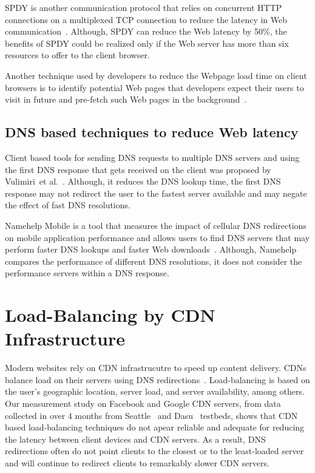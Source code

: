 \documentclass{llncs}
\begin{document}
SPDY is another communication protocol that relies on concurrent HTTP connections on a multiplexed TCP connection to reduce the latency in Web communication~\cite{spdy:whitepaper}\cite{googledevelopers:spdy}.
Although, SPDY can reduce the Web latency by 50\%, the benefits of SPDY could be realized only if the Web server has more than six resources to offer to the client browser.

Another technique used by developers to reduce the Webpage load time on client browsers is to identify potential Web pages that developers expect their users to visit in future and pre-fetch such Web pages in the background~\cite{google:bandwidthmanagement}.


\subsection{DNS based techniques to reduce Web latency}

Client based tools for sending DNS requests to multiple DNS servers and using the first DNS response that gets received on the client was proposed by Vulimiri~et al.~\cite{VulimiriConext13}.
Although, it reduces the DNS lookup time, the first DNS response may not redirect the user to the fastest server available and may negate the effect of fast DNS resolutions. 

Namehelp Mobile is a tool that measures the impact of cellular DNS redirections on mobile application performance and allows users to find DNS servers that may perform faster DNS lookups and faster Web downloads~\cite{RulaNamehelp}.
Although, Namehelp compares the performance of different DNS resolutions, it does not consider the performance servers within a DNS response. 


\section{Load-Balancing by CDN Infrastructure}
\label{discussion}

Modern websites rely on CDN infrastrucutre to speed up content delivery. 
CDNs balance load on their servers using DNS redirections~\cite{cdnloadbalancing:dyn}\cite{trafficdirector:dyn}. 
Load-balancing is based on the user's geographic location, server load, and server availability, among others.
Our measurement study on Facebook and Google CDN servers, from data collected in over 4 months from Seattle~\cite{JustinSeattle} and Dasu~\cite{dasuNSDI13} testbeds, shows that CDN based load-balancing techniques do not apear reliable and adequate for reducing the latency between client devices and CDN servers.
As a result, DNS redirections often do not point clients to the closest or to the least-loaded server and will continue to redirect clients to remarkably slower CDN servers.
\end{document}
